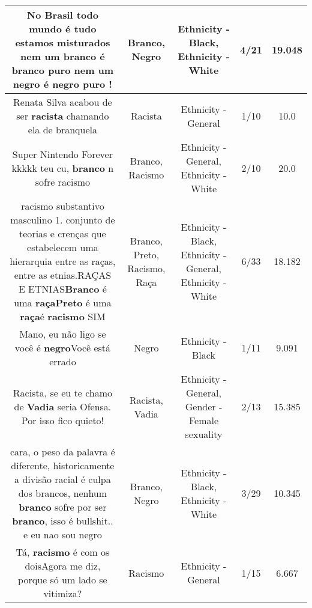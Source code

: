 \documentclass[11pt]{article}
\newlength\mylength
\begin{document}
\begin{center}
\begin{longtable}{|C{.65\mylength}|C{.30\mylength}|C{.12\mylength}|C{.12\mylength}|C{.12\mylength}|}
  \small No Brasil todo mundo é tudo estamos misturados nem um \textbf{branco} é \textbf{branco} puro nem um \textbf{negro} é \textbf{negro} puro !\normalsize   & Branco, Negro & Ethnicity - Black, Ethnicity - White & 4/21 & 19.048 \\  \hline
  \small Renata Silva acabou de ser \textbf{racista} chamando ela de branquela\normalsize   & Racista & Ethnicity - General & 1/10 & 10.0 \\  \hline
  \small Super Nintendo Forever kkkkk teu cu, \textbf{branco} n sofre racismo\normalsize   & Branco, Racismo & Ethnicity - General, Ethnicity - White & 2/10 & 20.0 \\  \hline
  \small racismo
substantivo masculino
1.
conjunto de teorias e crenças que estabelecem uma hierarquia entre as raças, entre as etnias.RAÇAS E ETNIAS\textbf{Branco} é uma \textbf{raça}\textbf{Preto} é uma \textbf{raça}é \textbf{racismo} SIM\normalsize   & Branco, Preto, Racismo, Raça & Ethnicity - Black, Ethnicity - General, Ethnicity - White & 6/33 & 18.182 \\  \hline
  \small Mano, eu não ligo se você é \textbf{negro}Você está errado\normalsize   & Negro & Ethnicity - Black & 1/11 & 9.091 \\  \hline
  \small Racista, se eu te chamo de \textbf{Vadia} seria Ofensa. Por isso fico quieto!\normalsize   & Racista, Vadia & Ethnicity - General, Gender - Female sexuality & 2/13 & 15.385 \\  \hline
  \small cara, o peso da palavra é diferente, historicamente a divisão racial é culpa dos brancos, nenhum \textbf{branco} sofre por ser \textbf{branco}, isso é bullshit.. e eu nao sou negro\normalsize   & Branco, Negro & Ethnicity - Black, Ethnicity - White & 3/29 & 10.345 \\  \hline
  \small Tá, \textbf{racismo} é com os doisAgora me diz, porque só um lado se vitimiza?\normalsize   & Racismo & Ethnicity - General & 1/15 & 6.667 \\  \hline

\end{longtable}
\end{center}
\end{document}

